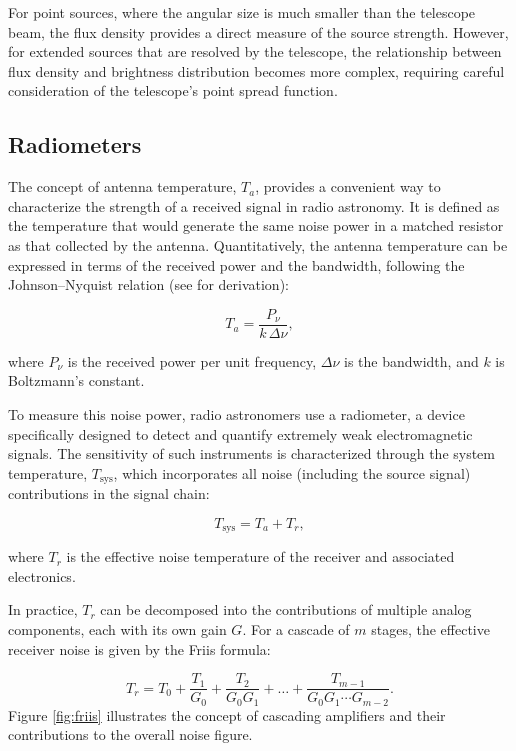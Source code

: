 For point sources, where the angular size is much smaller than the telescope beam, the flux density provides a direct measure of the source strength. However, for extended sources that are resolved by the telescope, the relationship between flux density and brightness distribution becomes more complex, requiring careful consideration of the telescope's point spread function.

\subsection{Radiometers}
The concept of antenna temperature, $T_a$, provides a convenient way to characterize the strength of a received signal in radio astronomy. It is defined as the temperature that would generate the same noise power in a matched resistor as that collected by the antenna. Quantitatively, the antenna temperature can be expressed in terms of the received power and the bandwidth, following the Johnson–Nyquist relation (see \citealt{Nyquits_noise} for derivation):

\begin{equation}
    T_a = \frac{P_\nu}{k \, \Delta \nu},
\end{equation}

where $P_\nu$ is the received power per unit frequency, $\Delta \nu$ is the bandwidth, and $k$ is Boltzmann’s constant. 


To measure this noise power, radio astronomers use a radiometer, a device specifically designed to detect and quantify extremely weak electromagnetic signals. The sensitivity of such instruments is characterized through the system temperature, $T_\text{sys}$, which incorporates all noise (including the source signal) contributions in the signal chain:  

\begin{equation}
    T_\text{sys} = T_a + T_r,
\end{equation}

where $T_r$ is the effective noise temperature of the receiver and associated electronics.  

In practice, $T_r$ can be decomposed into the contributions of multiple analog components, each with its own gain $G$. For a cascade of $m$ stages, the effective receiver noise is given by the Friis formula:  

\begin{equation}
    T_r = T_0 + \frac{T_1}{G_0} + \frac{T_2}{G_0 G_1} + \dots + \frac{T_{m-1}}{G_0 G_1 \cdots G_{m-2}}.
	\label{eq:friis}
\end{equation}
Figure \ref{fig:friis} illustrates the concept of cascading amplifiers and their contributions to the overall noise figure.

